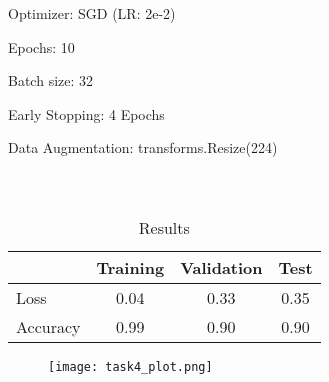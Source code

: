 \documentclass{article}
\begin{document}
Optimizer: SGD (LR: 2e-2)


Epochs: 10


Batch size: 32


Early Stopping: 4 Epochs




Data Augmentation: transforms.Resize(224)


\paragraph*{\ }

\begin{table}[h!]
	\centering
	\caption{Results}
	\begin{tabular}[t]{lccc}
		\hline
		         & Training & Validation & Test \\
		\hline
		Loss     & 0.04     & 0.33       & 0.35 \\
		Accuracy & 0.99     & 0.90       & 0.90 \\
		\hline
	\end{tabular}
\end{table}%
\begin{figure}[h!]
	\centering
	\texttt{[image: task4\_plot.png]}\label{hllono}
\end{figure}
\end{document}
